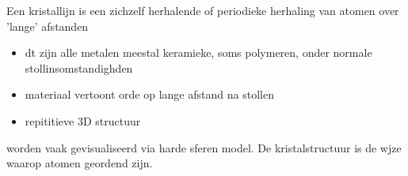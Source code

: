 \documentclass{report}
\begin{document}
Een kristallijn is een zichzelf herhalende of periodieke herhaling van atomen over 'lange' afstanden
\begin{itemize}
	\item dt zijn alle metalen meestal keramieke, soms polymeren, onder normale stollinsomstandighden
	\item materiaal vertoont orde op lange afstand na stollen
	\item repititieve 3D structuur
\end{itemize}
worden vaak gevisualiseerd via harde sferen model.
De kristalstructuur is de wjze waarop atomen geordend zijn.
\end{document}
